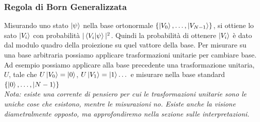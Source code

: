 \documentclass{article}
\begin{document}
    \subsubsection{Regola di Born Generalizzata}
    Misurando uno stato $\ket{\psi}$ nella base ortonormale $\{ \ket{V_0}, \dots, \ket{V_{N-1}} \}$, si ottiene lo sato $\ket{V_i}$ con probabilità $|\braket{V_i|\psi}|^2$. Quindi la probabilità di ottenere $\ket{V_i}$ è dato dal modulo quadro della proiezione su quel vattore della base. Per misurare su una base arbitraria possiamo applicare trasformazioni unitarie per cambiare base. Ad esempio possiamo applicare alla base precedente una trasformazione unitaria, $U$, tale che $U\ket{V_0} = \ket{0}$, $U\ket{V_1} = \ket{1} \dots$ e misurare nella base standard  $\{ \ket{0}, \dots, \ket{N-1} \}$
    \medskip
    \\ \textit{Nota: esiste una corrente di pensiero per cui le trasformazioni unitarie sono le uniche cose che esistono, mentre le misurazioni no. Esiste anche la visione diametralmente opposto, ma approfondiremo nella sezione sulle interpretazioni.}
\end{document}
